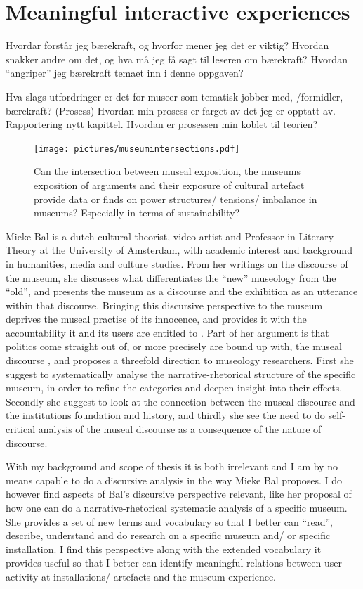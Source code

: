 \section{Meaningful interactive experiences}
Hvordar forstår jeg bærekraft, og hvorfor mener jeg det er viktig?
Hvordan snakker andre om det, og hva må jeg få sagt til leseren om bærekraft?
Hvordan “angriper” jeg bærekraft temaet inn i denne oppgaven? 

Hva slags utfordringer er det for museer som tematisk jobber med, /formidler, bærekraft? (Prosess) Hvordan min prosess er farget av det jeg er opptatt av. Rapportering nytt kapittel. Hvordan er prosessen min koblet til teorien?

\begin{figure}[h]
\texttt{[image: pictures/museumintersections.pdf]}
\caption{Can the intersection between museal exposition, the museums exposition of arguments and their exposure of cultural artefact provide data or finds on power structures/ tensions/ imbalance in museums? Especially in terms of sustainability?}
\centering
\end{figure}


Mieke Bal is a dutch cultural theorist, video artist and Professor in Literary Theory at the University of Amsterdam, with academic interest and background in humanities, media and culture studies. From her writings on the discourse of the museum, she discusses what differentiates the “new” museology from the “old”, and presents the museum as a discourse and the exhibition as an utterance within that discourse. Bringing this discursive perspective to the museum deprives the museal practise of its innocence, and provides it with the accountability it and its users are entitled to \autocite[p. 214]{Thi_book}. Part of her argument is that politics come straight out of, or more precisely are bound up with, the museal discourse \autocite[p. 214]{Thi_book}, and proposes a threefold direction to museology researchers. First she suggest to systematically analyse the narrative-rhetorical structure of the specific museum, in order to refine the categories and deepen insight into their effects. Secondly she suggest to look at the connection between the museal discourse and the institutions foundation and history, and thirdly she see the need to do self-critical analysis of the museal discourse as a consequence of the nature of discourse.

With my background and scope of thesis it is both irrelevant and I am by no means capable to do a discursive analysis in the way Mieke Bal proposes. I do however find aspects of Bal’s discursive perspective relevant, like her proposal of how one can do a narrative-rhetorical systematic analysis of a specific museum. She provides a set of new terms and vocabulary so that I better can “read”, describe, understand and do research on a specific museum and/ or specific installation. I find this perspective along with the extended vocabulary it provides useful so that I better can identify meaningful relations between user activity at installations/ artefacts and the museum experience.